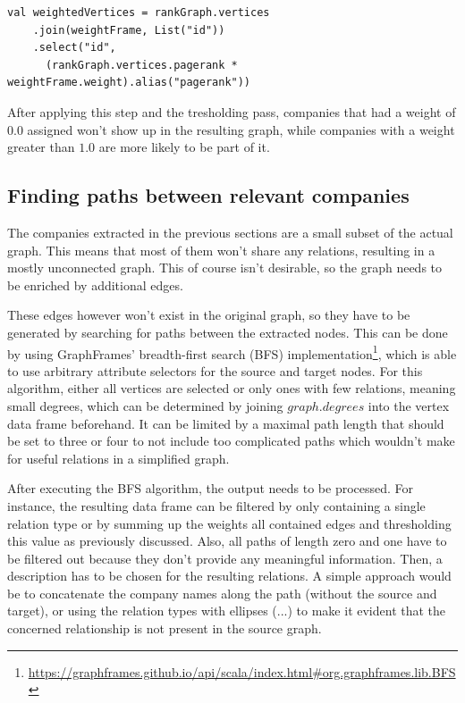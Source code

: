 \documentclass[
        a4paper,     %
        titlepage,   %
        oneside,     %
        parskip      %
]{scrartcl}          %
\begin{document}
  \begin{lstlisting}[style=scalaStyle,caption=Custom Weight Joining]
  val weightedVertices = rankGraph.vertices
    .join(weightFrame, List("id"))
    .select("id",
      (rankGraph.vertices.pagerank * weightFrame.weight).alias("pagerank"))
  \end{lstlisting}

  After applying this step and the tresholding pass, companies that had a weight of $0.0$ assigned won't
  show up in the resulting graph, while companies with a weight greater than $1.0$
  are more likely to be part of it.

  \subsection{Finding paths between relevant companies}
  The companies extracted in the previous sections are a small subset of the actual
  graph. This means that most of them won't share any relations, resulting in a
  mostly unconnected graph. This of course isn't desirable, so the graph needs to
  be enriched by additional edges.

  These edges however won't exist in the original graph, so they have to be generated
  by searching for paths between the extracted nodes. This can be done by using
  GraphFrames' breadth-first search (BFS)
  implementation\footnote{\url{https://graphframes.github.io/api/scala/index.html\#org.graphframes.lib.BFS}},
  which is able to use arbitrary attribute selectors for the source and target nodes.
  For this algorithm, either all vertices are selected or only ones with few relations,
  meaning small degrees, which can be determined by joining $graph.degrees$ into the vertex data frame beforehand.
  It can be limited by a maximal path length that should be set to three or four to not
  include too complicated paths which wouldn't make for useful relations in a simplified graph.

  After executing the BFS algorithm, the output needs to be processed. For instance,
  the resulting data frame can be filtered by only containing a single
  relation type or by summing up the weights all contained edges and thresholding
  this value as previously discussed. Also, all paths of length zero and one have to
  be filtered out because they don't provide any meaningful information.
  Then, a description has to be chosen for the resulting relations.
  A simple approach would be to concatenate the company names along the path
  (without the source and target), or using the relation types with ellipses (...) to
  make it evident that the concerned relationship is not present in the source graph.
\end{document}
